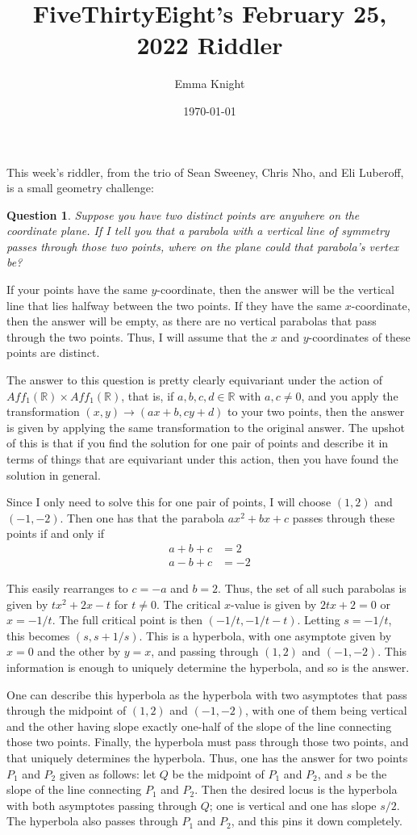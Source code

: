 \documentclass[11pt]{article}
\title{FiveThirtyEight's February 25, 2022 Riddler}
\author{Emma Knight}
\date{\today}
\newtheorem{question}[theorem]{Question}
\theoremstyle{definition}
\newcommand{\R}{\mathbb{R}}
\begin{document}
\maketitle
This week's riddler, from the trio of Sean Sweeney, Chris Nho, and Eli Luberoff, is a small geometry challenge:
\begin{question}
Suppose you have two distinct points are anywhere on the coordinate plane. If I tell you that a parabola with a vertical line of symmetry passes through those two points, where on the plane could that parabola’s vertex be?
\end{question}
If your points have the same $y$-coordinate, then the answer will be the vertical line that lies halfway between the two points.  If they have the same $x$-coordinate, then the answer will be empty, as there are no vertical parabolas that pass through the two points.  Thus, I will assume that the $x$ and $y$-coordinates of these points are distinct.

The answer to this question is pretty clearly equivariant under the action of $Aff_1(\R) \times Aff_1(\R)$, that is, if $a, b, c, d \in \R$ with $a, c \neq 0$, and you apply the transformation $(x, y) \rightarrow (ax + b, cy + d)$ to your two points, then the answer is given by applying the same transformation to the original answer.  The upshot of this is that if you find the solution for one pair of points and describe it in terms of things that are equivariant under this action, then you have found the solution in general.

Since I only need to solve this for one pair of points, I will choose $(1, 2)$ and $(-1, -2)$.  Then one has that the parabola $ax^2 + bx + c$ passes through these points if and only if
\begin{align*}
a + b + c & = 2 \\
a - b + c & = -2
\end{align*}

This easily rearranges to $c = -a$ and $b = 2$.  Thus, the set of all such parabolas is given by $tx^2 + 2x -t$ for $t \neq 0$.  The critical $x$-value is given by $2tx + 2 = 0$ or $x = -1/t$.  The full critical point is then $(-1/t, -1/t-t)$.  Letting $s = -1/t$, this becomes $(s, s + 1/s)$.  This is a hyperbola, with one asymptote given by $x = 0$ and the other by $y = x$, and passing through $(1, 2)$ and $(-1, -2)$.  This information is enough to uniquely determine the hyperbola, and so is the answer.

One can describe this hyperbola as the hyperbola with two asymptotes that pass through the midpoint of $(1, 2)$ and $(-1, -2)$, with one of them being vertical and the other having slope exactly one-half of the slope of the line connecting those two points.  Finally, the hyperbola must pass through those two points, and that uniquely determines the hyperbola.  Thus, one has the answer for two points $P_1$ and $P_2$ given as follows: let $Q$ be the midpoint of $P_1$ and $P_2$, and $s$ be the slope of the line connecting $P_1$ and $P_2$.  Then the desired locus is the hyperbola with both asymptotes passing through $Q$; one is vertical and one has slope $s/2$.  The hyperbola also passes through $P_1$ and $P_2$, and this pins it down completely.
\end{document}
